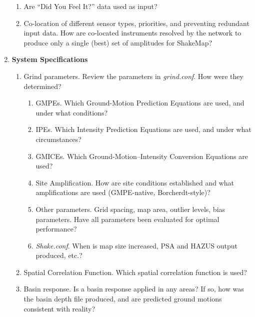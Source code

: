 \documentclass[letterpaper,10pt,english]{sphinxmanual}
\begin{document}
\begin{enumerate}
\begin{enumerate}
\item {} 
Are ``Did You Feel It?'' data used as input?

\item {} 
Co-location of different sensor types, priorities, and preventing redundant
input data. How are co-located instruments resolved by the network to
produce only a single (best) set of amplitudes for ShakeMap?

\end{enumerate}

\item {} 
\textbf{System Specifications}
\begin{enumerate}
\item {} 
Grind parameters. Review the parameters in \emph{grind.conf}. How were they
determined?
\begin{enumerate}
\item {} 
GMPEs. Which Ground-Motion Prediction Equations are used, and
under what conditions?

\item {} 
IPEs. Which Intensity Prediction Equations are used, and under what
circumstances?

\item {} 
GMICEs. Which Ground-Motion--Intensity Conversion Equations are
used?

\item {} 
Site Amplification.  How are site conditions established and what
amplifications are used (GMPE-native, Borcherdt-style)?

\item {} 
Other parameters. Grid spacing, map area, outlier levels, bias
parameters. Have all parameters been evaluated for optimal
performance?

\item {} 
\emph{Shake.conf}. When is map size increased, PSA and HAZUS output
produced, etc.?

\end{enumerate}

\item {} 
Spatial Correlation Function. Which spatial correlation function is used?

\item {} 
Basin response. Is a basin response applied in any areas? If so, how was the
basin depth file produced, and are predicted ground motions consistent with
reality?

\end{enumerate}


\end{enumerate}
\end{document}
